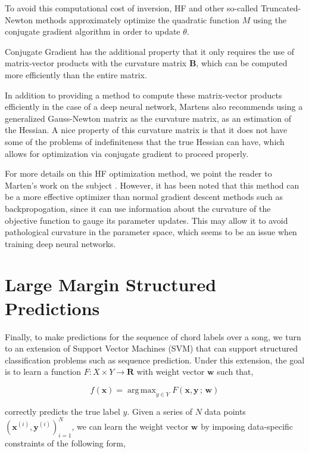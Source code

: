 \documentclass{article}
\DeclareMathOperator*{\argmax}{arg\,max}
\begin{document}
To avoid this computational cost of inversion, HF and other so-called
Truncated-Newton methods approximately optimize the quadratic function $M$
using the conjugate gradient algorithm in order to update $\theta$.

Conjugate Gradient has the additional property that it only requires the use
of matrix-vector products with the curvature matrix $\mathbf{B}$, which can
be computed more efficiently than the entire matrix.

In addition to providing a method to compute these matrix-vector products efficiently
in the case of a deep neural network, Martens also recommends using a generalized
Gauss-Newton matrix as the curvature matrix, as an estimation of the Hessian.
A nice property of this curvature matrix is that it does not have some of the
problems of indefiniteness that the true Hessian can have, which allows for 
optimization via conjugate gradient to proceed properly. 

For more details on this HF optimization method, we point the reader to
Marten's work on the subject \cite{martens2010deep}. However, it has been noted
that this method can be a more effective optimizer than normal gradient descent
methods such as backpropogation, since it can use information about the curvature
of the objective function to gauge its parameter updates. This may allow it
to avoid pathological curvature in the parameter space, which seems to be an
issue when training deep neural networks.

\section{Large Margin Structured Predictions}

Finally, to make predictions for the sequence of chord labels over a song,
we turn to an extension of Support Vector Machines (SVM) that can support
structured classification problems such as sequence prediction. Under this
extension, the goal is to learn a function $F : X \times Y \rightarrow
\mathbf{R}$ with weight vector $\mathbf{w}$ such that,

\begin{equation*}
f(\mathbf{x}) = \argmax_{y \in Y}F(\mathbf{x},\mathbf{y}\,;\,\mathbf{w})
\end{equation*}

correctly predicts the true label $y$. Given a series of $N$ data points
$(\mathbf{x}^{(i)}, \mathbf{y}^{(i)})_{i=1}^{N}$, we can learn the weight
vector $\mathbf{w}$ by imposing data-specific constraints of the following
form,
\end{document}
